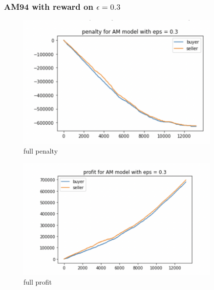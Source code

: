 \documentclass[11pt]{article}
\begin{document}
\subsubsection{AM94 with reward on $\epsilon = 0.3$}

\begin{figure}[H]
	\begin{center}
	\includegraphics[width=0.9\textwidth]{43.PNG}
	\end{center}
	\caption{full penalty}
	\label{FIG.43}
\end{figure}

\begin{figure}[H]
	\begin{center}
	\includegraphics[width=0.9\textwidth]{44.PNG}
	\end{center}
	\caption{full profit}
	\label{FIG.44}
\end{figure}
\end{document}
